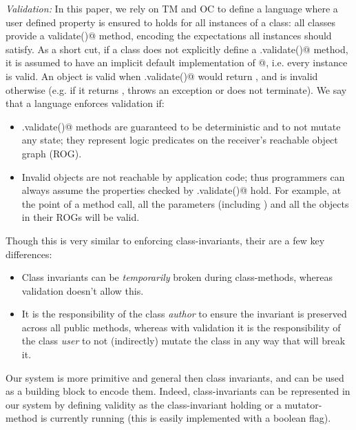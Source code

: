 \loseSpace
\noindent\textit{Validation:}
\label{s:validation}
In this paper, we rely on TM and OC to define a language where a user defined property is ensured to holds for all instances of a class:
all classes provide a \Q@Bool validate()@ method, encoding the expectations all instances should satisfy.
As a short cut, if a class does not explicitly define a
\Q@.validate()@ method, it is assumed to have an implicit default implementation of @, i.e. every instance is valid.
An object \Q@o@ is valid when \Q@o.validate()@ would return \Q@true@, and is invalid otherwise (e.g. if it returns \Q@false@, throws an exception or does not terminate).
We say that a language enforces validation if:
\begin{itemize}
\item \Q@.validate()@ methods are guaranteed to be deterministic and to not mutate any state; they represent logic predicates on the receiver’s reachable object graph (ROG).
\item Invalid objects are not reachable by application code; thus programmers can always assume the properties checked by \@Q.validate()@ hold.
For example, at the point of a method call, all the parameters (including \Q@this@) and all the objects in their ROGs will be valid.
\end{itemize}

\noindent Though this is very similar to enforcing class-invariants, their are a few key differences:
\begin{itemize}
\item Class invariants can be \emph{temporarily} broken during class-methods, whereas validation doesn’t allow this.
\item It is the responsibility of the class \emph{author} to ensure the invariant is preserved across all public methods, whereas with validation it is the responsibility of the class \emph{user} to not (indirectly) mutate the class in any way that will break it.
\end{itemize}
\noindent Our system is more primitive and general then class invariants, and can be used as a building block to encode 
them.
Indeed, class-invariants can be represented in our system by defining validity as 
the class-invariant holding or a mutator-method is currently running (this is easily implemented with a boolean flag).

